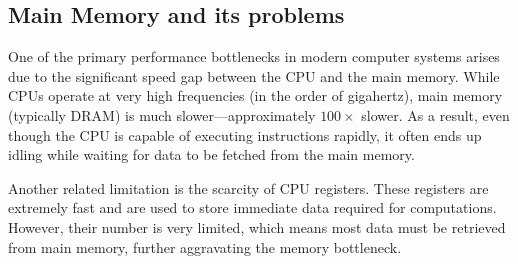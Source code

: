 \documentclass[12pt]{book}
\begin{document}
\subsection{Main Memory and its problems}

One of the primary performance bottlenecks in modern computer systems arises due to the significant speed gap between the CPU and the main memory. While CPUs operate at very high frequencies (in the order of gigahertz), main memory (typically DRAM) is much slower—approximately $100\times$ slower. As a result, even though the CPU is capable of executing instructions rapidly, it often ends up idling while waiting for data to be fetched from the main memory.

Another related limitation is the scarcity of CPU registers. These registers are extremely fast and are used to store immediate data required for computations. However, their number is very limited, which means most data must be retrieved from main memory, further aggravating the memory bottleneck.
\end{document}
